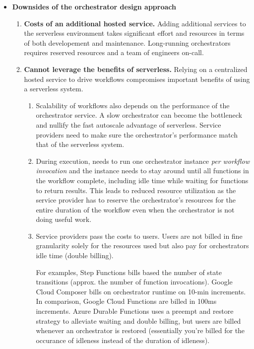 \begin{itemize}
  \item \textbf{Downsides of the orchestrator design approach}

    \begin{enumerate}
      \item \textbf{Costs of an additional hosted service.} Adding additional
      services to the serverless environment takes significant effort and
      resources in terms of both developement and maintenance. Long-running
      orchestrators requires reserved resources and a team of engineers
      on-call.

      \item \textbf{Cannot leverage the benefits of serverless.} Relying on a
      centralized hosted service to drive workflows compromises important
      benefits of using a serverless system.

        \begin{enumerate}

          \item Scalability of workflows also depends on the performance of
          the orchestrator service. A slow orchestrator can become the
          bottleneck and nullify the fast autoscale advantage of serverless.
          Service providers need to make sure the orchestrator's performance
          match that of the serverless system.

          \item During execution, needs to run one orchestrator instance
          \emph{per workflow invocation} and the instance needs to stay around
          until all functions in the workflow complete, including idle time
          while waiting for functions to return results. This leads to reduced
          resource utilization as the service provider has to reserve the
          orchestrator's resources for the entire duration of the workflow
          even when the orchestrator is not doing useful work.

          \item Service providers pass the costs to users. Users are not
          billed in fine granularity solely for the resources used but also
          pay for orchestrators idle time (double billing).

          For examples, Step Functions bills based the number of state
          transitions (approx. the number of function invocations). Google
          Cloud Composer bills on orchestrator runtime on 10-min increments.
          In comparison, Google Cloud Functions are billed in 100ms
          increments. Azure Durable Functions uses a preempt and restore
          strategy to alleviate waiting and double billing, but users are
          billed whenever an orchestrator is restored (essentially you're
          billed for the occurance of idleness instead of the duration of
          idleness).


\end{enumerate}
\end{enumerate}
\end{itemize}
